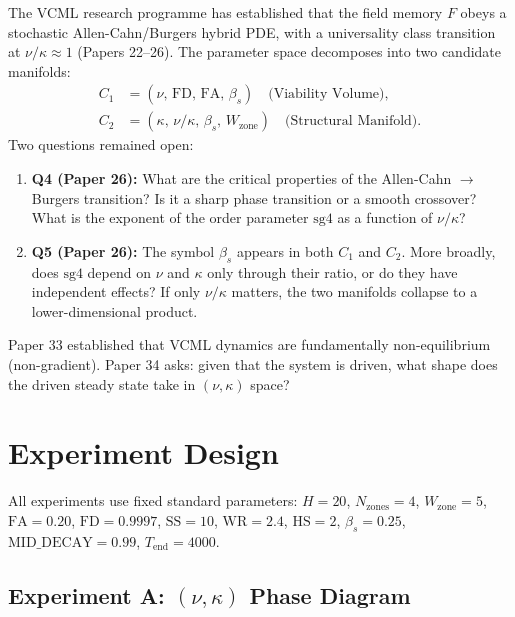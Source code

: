 \documentclass[11pt]{article}
\begin{document}
The VCML research programme has established that the field memory $F$ obeys a
stochastic Allen-Cahn/Burgers hybrid PDE, with a universality class transition
at $\nu/\kappa \approx 1$ (Papers 22--26). The parameter space decomposes into
two candidate manifolds:
\begin{align}
C_1 &= (\nu,\, \mathrm{FD},\, \mathrm{FA},\, \beta_s) \quad \text{(Viability Volume)},\\
C_2 &= (\kappa,\, \nu/\kappa,\, \beta_s,\, W_{\mathrm{zone}}) \quad \text{(Structural Manifold)}.
\end{align}
Two questions remained open:
\begin{enumerate}
\item \textbf{Q4 (Paper 26):} What are the critical properties of the Allen-Cahn $\to$ Burgers
  transition? Is it a sharp phase transition or a smooth crossover? What is the exponent of
  the order parameter $\mathrm{sg4}$ as a function of $\nu/\kappa$?
\item \textbf{Q5 (Paper 26):} The symbol $\beta_s$ appears in both $C_1$ and $C_2$.
  More broadly, does $\mathrm{sg4}$ depend on $\nu$ and $\kappa$ only through their ratio,
  or do they have independent effects? If only $\nu/\kappa$ matters, the two manifolds
  collapse to a lower-dimensional product.
\end{enumerate}

Paper 33 established that VCML dynamics are fundamentally non-equilibrium (non-gradient).
Paper 34 asks: given that the system is driven, what shape does the driven steady state
take in $(\nu, \kappa)$ space?

\section{Experiment Design}

All experiments use fixed standard parameters: $H=20$, $N_{\mathrm{zones}}=4$,
$W_{\mathrm{zone}}=5$, $\mathrm{FA}=0.20$, $\mathrm{FD}=0.9997$, $\mathrm{SS}=10$,
$\mathrm{WR}=2.4$, $\mathrm{HS}=2$, $\beta_s=0.25$, $\mathrm{MID\_DECAY}=0.99$,
$T_{\mathrm{end}}=4000$.

\subsection*{Experiment A: $(\nu, \kappa)$ Phase Diagram}
\end{document}
